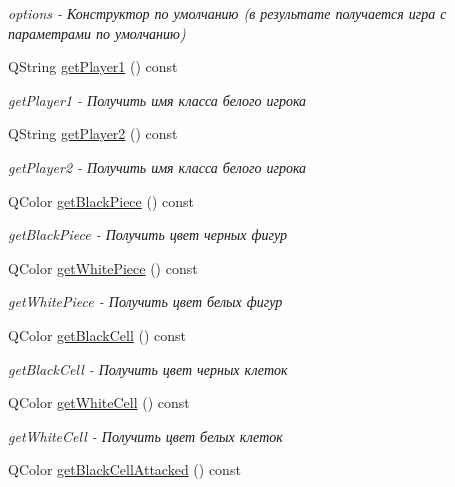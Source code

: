 \begin{DoxyCompactItemize}
\begin{DoxyCompactList}\small\item\em options -\/ Конструктор по умолчанию (в результате получается игра с параметрами по умолчанию) \end{DoxyCompactList}\item 
Q\+String \hyperlink{classoptions_aa08f770c27db29c587278cc0f8d3fb4d}{get\+Player1} () const 
\begin{DoxyCompactList}\small\item\em get\+Player1 -\/ Получить имя класса белого игрока \end{DoxyCompactList}\item 
Q\+String \hyperlink{classoptions_a26d94b8c314df0b355ba4f8dbf65eab5}{get\+Player2} () const 
\begin{DoxyCompactList}\small\item\em get\+Player2 -\/ Получить имя класса белого игрока \end{DoxyCompactList}\item 
Q\+Color \hyperlink{classoptions_aba7e46667f824c75d1acef548aeac3b4}{get\+Black\+Piece} () const 
\begin{DoxyCompactList}\small\item\em get\+Black\+Piece -\/ Получить цвет черных фигур \end{DoxyCompactList}\item 
Q\+Color \hyperlink{classoptions_a87429d553ea8c806f0f8623434c156a0}{get\+White\+Piece} () const 
\begin{DoxyCompactList}\small\item\em get\+White\+Piece -\/ Получить цвет белых фигур \end{DoxyCompactList}\item 
Q\+Color \hyperlink{classoptions_afa462be4a4c645b4cb616ae2d175b31c}{get\+Black\+Cell} () const 
\begin{DoxyCompactList}\small\item\em get\+Black\+Cell -\/ Получить цвет черных клеток \end{DoxyCompactList}\item 
Q\+Color \hyperlink{classoptions_a4297375082b4a84b4e350119254b3c85}{get\+White\+Cell} () const 
\begin{DoxyCompactList}\small\item\em get\+White\+Cell -\/ Получить цвет белых клеток \end{DoxyCompactList}\item 
Q\+Color \hyperlink{classoptions_ad26a5fdfdaf092c39ac3d167981bd2b5}{get\+Black\+Cell\+Attacked} () const 

\end{DoxyCompactItemize}
